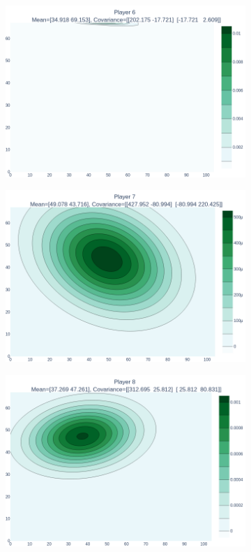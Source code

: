 \documentclass[14pt,a4]{article}
\begin{document}
\begin{figure}[h]
\begin{subfigure}{0.3\linewidth}
        \includegraphics[scale=0.1]{images/q6/partb/6.png}
    \end{subfigure}
    \hfill
    \begin{subfigure}{0.3\linewidth}
        \centering
        \includegraphics[scale=0.1]{images/q6/partb/7.png}
    \end{subfigure}
    \newline
    \begin{subfigure}{0.3\linewidth}
        \centering
        \includegraphics[scale=0.1]{images/q6/partb/8.png}

\end{subfigure}
\end{figure}
\end{document}
